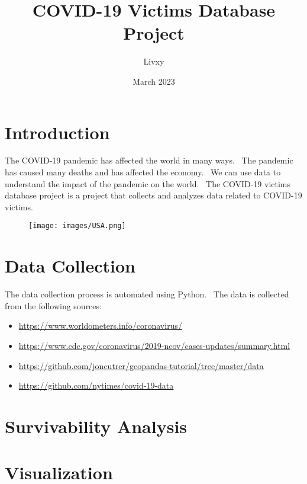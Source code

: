 \documentclass{article}
\begin{document}
\title{COVID-19 Victims Database Project}
\author{Livxy}
\date{March 2023}

\maketitle
\thispagestyle{empty}
\vspace{50cm}


\section{Introduction}
The COVID-19 pandemic has affected the world in many ways. \
The pandemic has caused many deaths and has affected the economy. \
We can use data to understand the impact of the pandemic on the world. \
The COVID-19 victims database project is a project that collects and analyzes data related to COVID-19 victims.

\begin{figure}[h]
\centering
\texttt{[image: images/USA.png]}
\end{figure}


\section{Data Collection}
The data collection process is automated using Python. \
The data is collected from the following sources: \
\begin{itemize}
\item \url{https://www.worldometers.info/coronavirus/}
\item \url{https://www.cdc.gov/coronavirus/2019-ncov/cases-updates/summary.html}
\item \url{https://github.com/joncutrer/geopandas-tutorial/tree/master/data}
\item \url{https://github.com/nytimes/covid-19-data}
\end{itemize}



\section{Survivability Analysis}


\section{Visualization}
\end{document}
